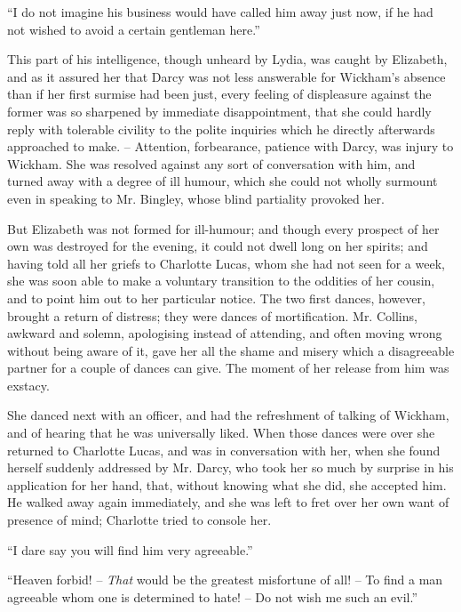 “I do not imagine his business would have called him
away just now, if he had not wished to avoid a certain
gentleman here.”

This part of his intelligence, though unheard by Lydia,
was caught by Elizabeth, and as it assured her that Darcy
was not less answerable for Wickham’s absence than if her
first surmise had been just, every feeling of displeasure
against the former was so sharpened by immediate disappointment,
that she could hardly reply with tolerable
civility to the polite inquiries which he directly afterwards
approached to make. -- Attention, forbearance, patience
with Darcy, was injury to Wickham. She was resolved
against any sort of conversation with him, and turned
away with a degree of ill humour, which she could not
wholly surmount even in speaking to Mr. Bingley, whose
blind partiality provoked her.

But Elizabeth was not formed for ill-humour; and
though every prospect of her own was destroyed for the
evening, it could not dwell long on her spirits; and
having told all her griefs to Charlotte Lucas, whom she
had not seen for a week, she was soon able to make a
voluntary transition to the oddities of her cousin, and
to point him out to her particular notice. The two first
dances, however, brought a return of distress; they were
dances of mortification. Mr. Collins, awkward and solemn,
apologising instead of attending, and often moving wrong
without being aware of it, gave her all the shame and
misery which a disagreeable partner for a couple of dances
can give. The moment of her release from him was exstacy.

She danced next with an officer, and had the refreshment
of talking of Wickham, and of hearing that he was
universally liked. When those dances were over she
returned to Charlotte Lucas, and was in conversation
with her, when she found herself suddenly addressed by
Mr. Darcy, who took her so much by surprise in his
application for her hand, that, without knowing what she
did, she accepted him. He walked away again immediately,
and she was left to fret over her own want of presence
of mind; Charlotte tried to console her.

“I dare say you will find him very agreeable.”

“Heaven forbid! -- \textit{That} would be the greatest misfortune
of all! -- To find a man agreeable whom one is
determined to hate! -- Do not wish me such an evil.”

